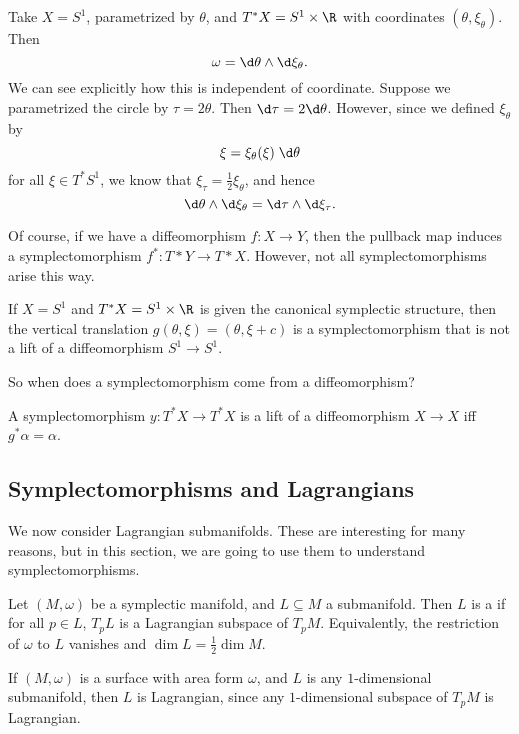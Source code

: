 \documentclass[a4paper]{article}
\begin{document}
\begin{eg}
  Take $X = S^1$, parametrized by $\theta$, and $T^* X = S^1 \times \R$ with coordinates $(\theta, \xi_\theta)$. Then
  \[
    \omega = \d \theta \wedge \d \xi_\theta.
  \]
  We can see explicitly how this is independent of coordinate. Suppose we parametrized the circle by $\tau = 2 \theta$. Then $\d \tau = 2 \d \theta$. However, since we defined $\xi_\theta$ by
  \[
    \xi = \xi_\theta(\xi) \;\d \theta
  \]
  for all $\xi \in T^* S^1$, we know that $\xi_\tau = \frac{1}{2} \xi_\theta$, and hence
  \[
    \d \theta \wedge \d \xi_\theta = \d \tau \wedge \d \xi_\tau.
  \]
\end{eg}

Of course, if we have a diffeomorphism $f: X \to Y$, then the pullback map induces a symplectomorphism $f^*: T*Y \to T*X$. However, not all symplectomorphisms arise this way.
\begin{eg}
  If $X = S^1$ and $T^* X = S^1 \times \R$ is given the canonical symplectic structure, then the vertical translation $g(\theta, \xi) = (\theta, \xi + c)$ is a symplectomorphism that is not a lift of a diffeomorphism $S^1 \to S^1$.
\end{eg}

So when does a symplectomorphism come from a diffeomorphism?

\begin{ex}
  A symplectomorphism $y: T^* X \to T^* X$ is a lift of a diffeomorphism $X \to X$ iff $g^* \alpha = \alpha$.
\end{ex}

\subsection{Symplectomorphisms and Lagrangians}
We now consider Lagrangian submanifolds. These are interesting for many reasons, but in this section, we are going to use them to understand symplectomorphisms.
\begin{defi}
  Let $(M, \omega)$ be a symplectic manifold, and $L \subseteq M$ a submanifold. Then $L$ is a  if for all $p \in L$, $T_p L$ is a Lagrangian subspace of $T_p M$. Equivalently, the restriction of $\omega$ to $L$ vanishes and $\dim L = \frac{1}{2} \dim M$.
\end{defi}

\begin{eg}
  If $(M, \omega)$ is a surface with area form $\omega$, and $L$ is any $1$-dimensional submanifold, then $L$ is Lagrangian, since any $1$-dimensional subspace of $T_p M$ is Lagrangian.
\end{eg}
\end{document}
